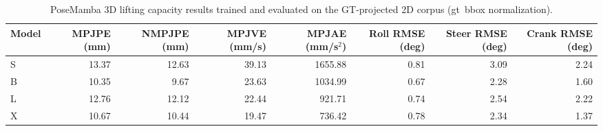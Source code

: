 \begin{table}[t]
\centering
\caption{PoseMamba 3D lifting capacity results trained and evaluated on the GT-projected 2D corpus (gt\ bbox normalization).}
\begin{tabular}{lrrrrrrr}
\toprule
Model & MPJPE (mm) & NMPJPE (mm) & MPJVE (mm/s) & MPJAE (mm/s$^2$) & Roll RMSE (deg) & Steer RMSE (deg) & Crank RMSE (deg) \\
\midrule
S & 13.37 & 12.63 & 39.13 & 1655.88 & 0.81 & 3.09 & 2.24 \\
B & 10.35 & 9.67 & 23.63 & 1034.99 & 0.67 & 2.28 & 1.60 \\
L & 12.76 & 12.12 & 22.44 & 921.71 & 0.74 & 2.54 & 2.22 \\
X & 10.67 & 10.44 & 19.47 & 736.42 & 0.78 & 2.34 & 1.37 \\
\bottomrule
\end{tabular}
\end{table}